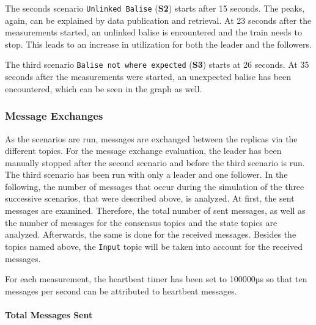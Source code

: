 The seconds scenario \texttt{Unlinked Balise} (\textbf{S2}) starts after 15 seconds.
The peaks, again, can be explained by data publication and retrieval.
At 23 seconds after the measurements started, an unlinked balise is encountered and the train needs to stop.
This leads to an increase in  utilization for both the leader and the followers.

The third scenario \texttt{Balise not where expected} (\textbf{S3}) starts at 26 seconds.
At 35 seconds after the measurements were started, an unexpected balise has been encountered, which can be seen in the graph as well.

\subsubsection{Message Exchanges}
As the scenarios are run, messages are exchanged between the replicas via the different  topics.
For the message exchange evaluation, the leader has been manually stopped after the second scenario and before the third scenario is run.
The third scenario has been run with only a leader and one follower.
In the following, the number of messages that occur during the simulation of the three successive scenarios, that were described above, is analyzed.
At first, the sent messages are examined.
Therefore, the total number of sent messages, as well as the number of messages for the consensus topics and the state topics are analyzed.
Afterwards, the same is done for the received messages.
Besides the topics named above, the \texttt{Input} topic will be taken into account for the received messages.

For each measurement, the heartbeat timer has been set to 100000µs so that ten messages per second can be attributed to heartbeat messages.

\paragraph{Total Messages Sent}

